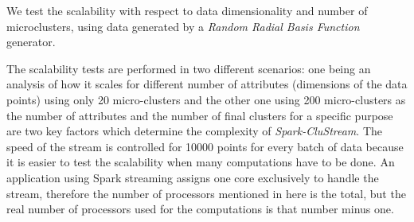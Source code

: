 We test the scalability with respect to data dimensionality and number of microclusters, using data generated by a \textit{Random Radial Basis Function} generator.

The scalability tests are performed in two different scenarios: one being an analysis of how it scales for different number of attributes (dimensions of the data points) using only 20 micro-clusters and the other one using 200 micro-clusters as the number of attributes and the number of final clusters for a specific purpose are two key factors which determine the complexity of \textit{Spark-CluStream}. The speed of the stream is controlled for 10000 points for every batch of data because it is easier to test the scalability when many computations have to be done. An application using Spark streaming assigns one core exclusively to handle the stream, therefore the number of processors mentioned in here is the total, but the real number of processors used for the computations is that number minus one.


